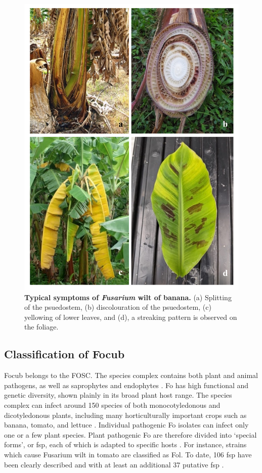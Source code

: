 \begin{figure}[pt!]
    \centering
    \includegraphics[width=15cm]{Figures/SymptomsofFoc.pdf}
    \caption[Typical symptoms of Fusarium  wilt of banana.]{\textbf{Typical symptoms of \textit{Fusarium} wilt of banana.} (a) Splitting of the psuedostem, (b) discolouration of the psuedostem, (c) yellowing of lower leaves, and (d), a streaking pattern is observed on the foliage.}
    \label{fig:FusariumWiltSymptoms}
\end{figure}

\subsection{Classification of \acl{Focub}}

\ac{Focub} belongs to the \ac{FOSC}. The species complex contains both plant and animal pathogens, as well as saprophytes and endophytes \parencite{Leslie2006}. \acs{Fo} has high functional and genetic diversity, shown plainly in its broad plant host range. The species complex can infect around 150 species of both monocotyledonous and dicotyledonous plants, including many horticulturally important crops such as banana, tomato, and lettuce \parencite{Edel-Hermann2019}.  Individual pathogenic \ac{Fo} isolates can infect only one or a few plant species. Plant pathogenic \ac{Fo} are therefore divided into ‘special forms’, or \ac{fsp}, each of which is adapted to specific hosts \parencite{Snyder1940}. For instance, strains which cause Fusarium wilt in tomato are classified as \ac{Fol}. To date, 106 \ac{fsp} have been clearly described and with at least an additional 37 putative \ac{fsp} \parencite{Edel-Hermann2019}.   


